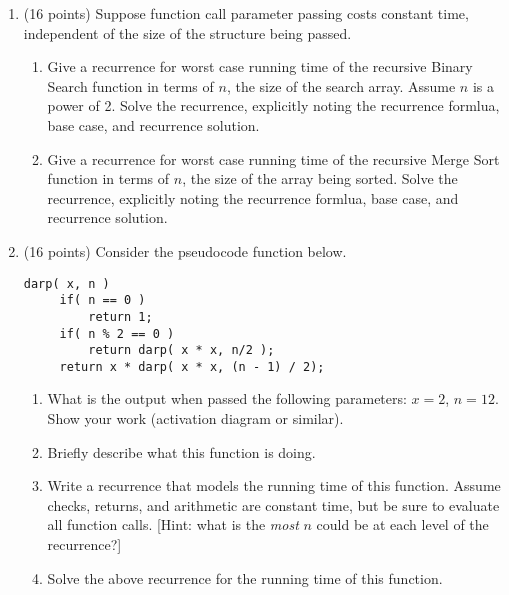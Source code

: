 \documentclass[12pt]{article}
\begin{document}
\begin{enumerate}
\begin{enumerate}
\end{enumerate}

\item (16 points) Suppose function call parameter passing costs constant time,
    independent of the size of the structure being passed.

\begin{enumerate}

\item Give a recurrence for worst case running time of the recursive Binary
    Search function in terms of $n$, the size of the search array. Assume $n$ is
    a power of 2. Solve the recurrence, explicitly noting the recurrence
    formlua, base case, and recurrence solution.

\item Give a recurrence for worst case running time of the recursive Merge Sort
    function in terms of $n$, the size of the array being sorted. Solve the
    recurrence, explicitly noting the recurrence formlua, base case, and
    recurrence solution.

\end{enumerate}

\item (16 points) Consider the pseudocode function below.

\begin{verbatim}
darp( x, n )
     if( n == 0 )
         return 1;
     if( n % 2 == 0 )
         return darp( x * x, n/2 );
     return x * darp( x * x, (n - 1) / 2);
\end{verbatim}

\begin{enumerate}

\item What is the output when passed the following parameters: $x=2$, $n=12$.
    Show your work (activation diagram or similar).

\item Briefly describe what this function is doing.

\item Write a recurrence that models the running time of this function.  Assume
    checks, returns, and arithmetic are constant time, but be sure to evaluate
    all function calls. [Hint: what is the \emph{most} $n$ could be at each
    level of the recurrence?]

\item Solve the above recurrence for the running time of this function.

\end{enumerate}

\end{enumerate}
\end{document}
